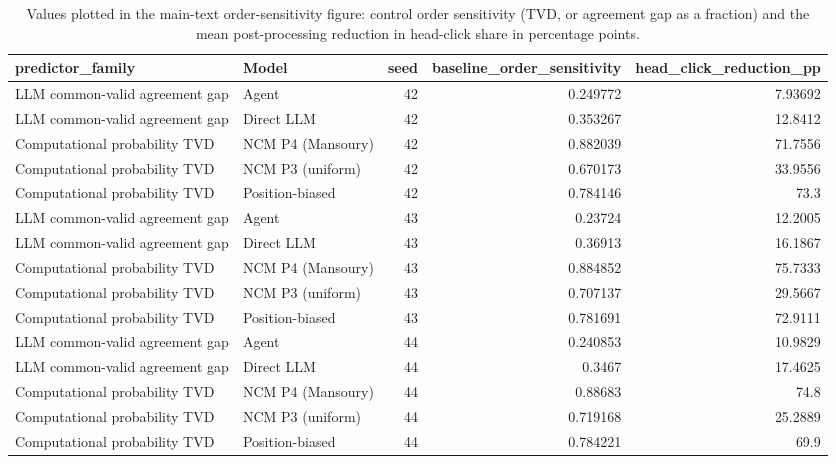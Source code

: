 \begin{table}[htbp!]
\centering
\small
\setlength{\tabcolsep}{3pt}
\renewcommand{\arraystretch}{1.1}
\begin{tabular}{llrrr}
\hline
predictor\_family & Model & seed & baseline\_order\_sensitivity & head\_click\_reduction\_pp \\
\hline
LLM common-valid agreement gap & Agent & 42 & 0.249772 & 7.93692 \\
LLM common-valid agreement gap & Direct LLM & 42 & 0.353267 & 12.8412 \\
Computational probability TVD & NCM P4 (Mansoury) & 42 & 0.882039 & 71.7556 \\
Computational probability TVD & NCM P3 (uniform) & 42 & 0.670173 & 33.9556 \\
Computational probability TVD & Position-biased & 42 & 0.784146 & 73.3 \\
LLM common-valid agreement gap & Agent & 43 & 0.23724 & 12.2005 \\
LLM common-valid agreement gap & Direct LLM & 43 & 0.36913 & 16.1867 \\
Computational probability TVD & NCM P4 (Mansoury) & 43 & 0.884852 & 75.7333 \\
Computational probability TVD & NCM P3 (uniform) & 43 & 0.707137 & 29.5667 \\
Computational probability TVD & Position-biased & 43 & 0.781691 & 72.9111 \\
LLM common-valid agreement gap & Agent & 44 & 0.240853 & 10.9829 \\
LLM common-valid agreement gap & Direct LLM & 44 & 0.3467 & 17.4625 \\
Computational probability TVD & NCM P4 (Mansoury) & 44 & 0.88683 & 74.8 \\
Computational probability TVD & NCM P3 (uniform) & 44 & 0.719168 & 25.2889 \\
Computational probability TVD & Position-biased & 44 & 0.784221 & 69.9 \\
\hline
\end{tabular}
\caption{Values plotted in the main-text order-sensitivity figure: control order sensitivity (TVD, or agreement gap as a fraction) and the mean post-processing reduction in head-click share in percentage points.}
\label{chap:results:tab:main_rq5_order_sensitivity_values}
\end{table}
